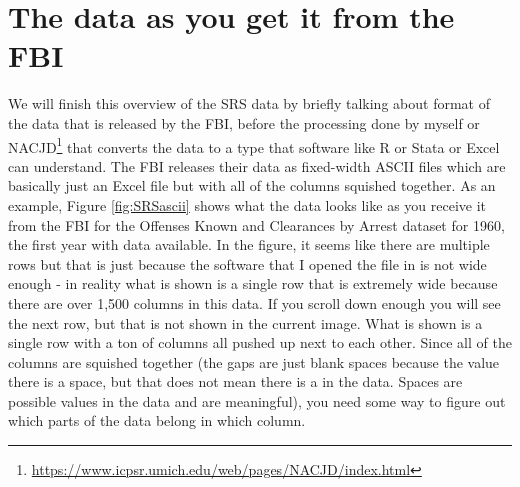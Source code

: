 \documentclass[
]{krantz}
\renewcommand{\href}[2]{#2\footnote{\url{#1}}}
\begin{document}
\section{The data as you get it from the
FBI}\label{the-data-as-you-get-it-from-the-fbi}

We will finish this overview of the SRS data by briefly
talking about format of the data that is released by the
FBI, before the processing done by myself or
\href{https://www.icpsr.umich.edu/web/pages/NACJD/index.html}{NACJD}
that converts the data to a type that software like R or
Stata or Excel can understand. The FBI releases their data
as fixed-width ASCII files which are basically just an Excel
file but with all of the columns squished together. As an
example, Figure \ref{fig:SRSascii} shows what the data looks
like as you receive it from the FBI for the Offenses Known
and Clearances by Arrest dataset for 1960, the first year
with data available. In the figure, it seems like there are
multiple rows but that is just because the software that I
opened the file in is not wide enough - in reality what is
shown is a single row that is extremely wide because there
are over 1,500 columns in this data. If you scroll down
enough you will see the next row, but that is not shown in
the current image. What is shown is a single row with a ton
of columns all pushed up next to each other. Since all of
the columns are squished together (the gaps are just blank
spaces because the value there is a space, but that does not
mean there is a in the data. Spaces are possible values in
the data and are meaningful), you need some way to figure
out which parts of the data belong in which column.
\end{document}
